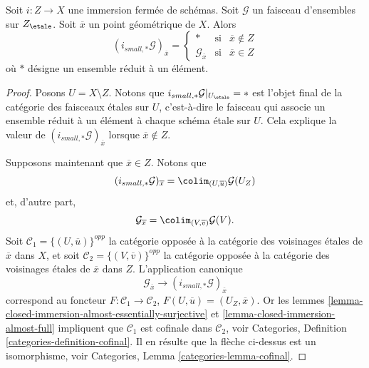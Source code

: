 \begin{lemma}
\label{lemma-stalk-pushforward-closed-immersion}
Soit $i : Z \to X$ une immersion ferm\'ee de sch\'emas.
Soit $\mathcal{G}$ un faisceau d'ensembles sur $Z_\etale$.
Soit $\overline{x}$ un point g\'eom\'etrique de $X$.
Alors
$$
(i_{small, *}\mathcal{G})_{\overline{x}} =
\left\{
\begin{matrix}
* & \text{si} & \overline{x} \not \in Z \\
\mathcal{G}_{\overline{x}} & \text{si} & \overline{x} \in Z
\end{matrix}
\right.
$$
o\`u $*$ d\'esigne un ensemble r\'eduit \`a un \'el\'ement.
\end{lemma}

\begin{proof}
Posons $U = X \setminus Z$.
Notons que $i_{small, *}\mathcal{G}|_{U_\etale} = *$ est l'objet final
de la cat\'egorie des faisceaux \'etales sur $U$, c'est-\`a-dire le faisceau
qui associe un ensemble r\'eduit \`a un \'el\'ement \`a chaque sch\'ema \'etale sur $U$.
Cela explique la valeur de $(i_{small, *}\mathcal{G})_{\overline{x}}$
lorsque $\overline{x} \not \in Z$.

\medskip\noindent
Supposons maintenant que $\overline{x} \in Z$. Notons que
$$
(i_{small, *}\mathcal{G})_{\overline{x}}
=
\colim_{(U, \overline{u})} \mathcal{G}(U_Z)
$$
et, d'autre part,
$$
\mathcal{G}_{\overline{x}}
=
\colim_{(V, \overline{v})} \mathcal{G}(V).
$$
Soit $\mathcal{C}_1 = \{(U, \overline{u})\}^{opp}$ la cat\'egorie oppos\'ee \`a la
cat\'egorie des voisinages \'etales de $\overline{x}$ dans $X$, et soit
$\mathcal{C}_2 = \{(V, \overline{v})\}^{opp}$ la cat\'egorie oppos\'ee \`a la
cat\'egorie des voisinages \'etales de $\overline{x}$ dans $Z$. L'application canonique
$$
\mathcal{G}_{\overline{x}}
\longrightarrow
(i_{small, *}\mathcal{G})_{\overline{x}}
$$
correspond au foncteur $F : \mathcal{C}_1 \to \mathcal{C}_2$,
$F(U, \overline{u}) = (U_Z, \overline{x})$. Or les
lemmes \ref{lemma-closed-immersion-almost-essentially-surjective} et
\ref{lemma-closed-immersion-almost-full}
impliquent que $\mathcal{C}_1$ est cofinale dans $\mathcal{C}_2$, voir
Categories, Definition \ref{categories-definition-cofinal}.
Il en r\'esulte que la fl\`eche ci-dessus est un isomorphisme, voir
Categories, Lemma \ref{categories-lemma-cofinal}.
\end{proof}


